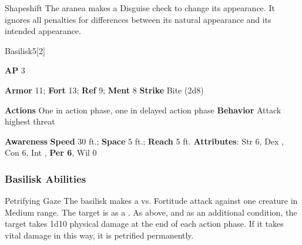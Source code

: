 \begin{ability}{Shapeshift}
The aranea makes a Disguise check to change its appearance.
It ignores all penalties for differences between its natural appearance and its intended appearance.
\end{ability}






\begin{monsection}{Basilisk}{5}[2]
\vspace{-1em}\vspace{-1em}
\begin{spellcontent}
\begin{spelltargetinginfo}
{\textbf{AP} 3}

\pari \textbf{Armor} 11;
\textbf{Fort} 13;
\textbf{Ref} 9;
\textbf{Ment} 8
\pari \textbf{Strike} Bite  (2d8)


\pari \textbf{Actions} One in action phase, one in delayed action phase
\pari \textbf{Behavior} Attack highest threat
\end{spelltargetinginfo}
\end{spellcontent}

\begin{monsterfooter}
\pari \textbf{Awareness} 
\pari \textbf{Speed} 30 ft.;
\textbf{Space} 5 ft.;
\textbf{Reach} 5 ft.
\pari \textbf{Attributes}:
Str 6,
Dex ,
Con 6,
Int ,
\textbf{Per 6},
Wil 0
\end{monsterfooter}
\end{monsection}


\subsubsection{Basilisk Abilities}

\begin{ability}{Petrifying Gaze}
The basilisk makes a  vs. Fortitude attack against one creature in Medium range.
\hit The target is  as a .
\crit As above, and as an additional condition, the target takes 1d10 physical damage at the end of each action phase.
If it takes vital damage in this way, it is petrified permanently.
\end{ability}






